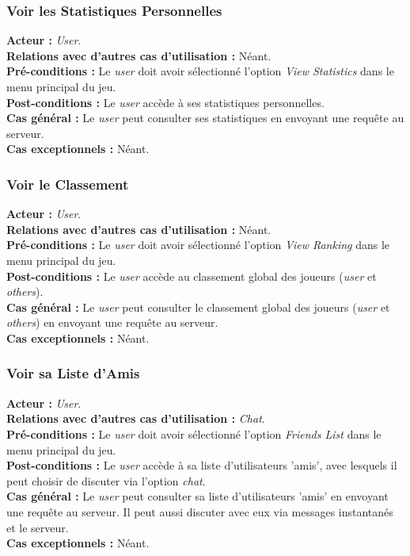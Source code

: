 \documentclass[10pt, a4paper]{article}
\begin{document}
\subsubsection{Voir les Statistiques Personnelles}
\textbf{Acteur :} \textit{User}.\\
\textbf{Relations avec d'autres cas d'utilisation :} Néant.\\
\textbf{Pré-conditions :} Le \textit{user} doit avoir sélectionné l'option \textit{View Statistics} dans le menu principal du jeu.\\
\textbf{Post-conditions :} Le \textit{user} accède à ses statistiques personnelles.\\
\textbf{Cas général :} Le \textit{user} peut consulter ses statistiques en envoyant une requête au serveur.\\
\textbf{Cas exceptionnels :} Néant.

\subsubsection{Voir le Classement}
\textbf{Acteur :} \textit{User}.\\
\textbf{Relations avec d'autres cas d'utilisation :} Néant.\\
\textbf{Pré-conditions :} Le \textit{user} doit avoir sélectionné l'option \textit{View Ranking} dans le menu principal du jeu.\\
\textbf{Post-conditions :} Le \textit{user} accède au classement global des joueurs (\textit{user} et \textit{others}).\\
\textbf{Cas général :} Le \textit{user} peut consulter le classement global des joueurs (\textit{user} et \textit{others}) en envoyant une requête au serveur.\\
\textbf{Cas exceptionnels :} Néant.

\subsubsection{Voir sa Liste d'Amis}
\textbf{Acteur :} \textit{User}.\\
\textbf{Relations avec d'autres cas d'utilisation :} \textit{Chat}.\\
\textbf{Pré-conditions :} Le \textit{user} doit avoir sélectionné l'option \textit{Friends List} dans le menu principal du jeu.\\
\textbf{Post-conditions :} Le \textit{user} accède à sa liste d'utilisateurs 'amis', avec lesquels il peut choisir de discuter via l'option \textit{chat}.\\
\textbf{Cas général :} Le \textit{user} peut consulter sa liste d'utilisateurs 'amis' en envoyant une requête au serveur. Il peut aussi discuter avec eux via messages instantanés et le serveur.\\
\textbf{Cas exceptionnels :} Néant.
\end{document}
